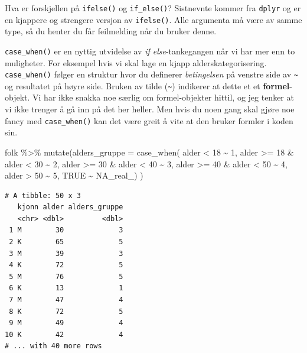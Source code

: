 \documentclass[
  letterpaper,
  DIV=11,
  numbers=noendperiod]{scrreprt}
\newenvironment{Shaded}{\begin{snugshade}}{\end{snugshade}}
\newcommand{\AttributeTok}[1]{\textcolor[rgb]{0.40,0.45,0.13}{#1}}
\newcommand{\ConstantTok}[1]{\textcolor[rgb]{0.56,0.35,0.01}{#1}}
\newcommand{\DecValTok}[1]{\textcolor[rgb]{0.68,0.00,0.00}{#1}}
\newcommand{\FunctionTok}[1]{\textcolor[rgb]{0.28,0.35,0.67}{#1}}
\newcommand{\NormalTok}[1]{\textcolor[rgb]{0.00,0.23,0.31}{#1}}
\newcommand{\SpecialCharTok}[1]{\textcolor[rgb]{0.37,0.37,0.37}{#1}}
\begin{document}
Hva er forskjellen på \texttt{ifelse()} og \texttt{if\_else()}?
Sistnevnte kommer fra \texttt{dplyr} og er en kjappere og strengere
versjon av \texttt{ifelse()}. Alle argumenta må være av samme type, så
du henter du får feilmelding når du bruker denne.

\texttt{case\_when()} er en nyttig utvidelse av \emph{if
else}-tankegangen når vi har mer enn to muligheter. For eksempel hvis vi
skal lage en kjapp alderskategorisering. \texttt{case\_when()} følger en
struktur hvor du definerer \emph{betingelsen} på venstre side av
\texttt{\textasciitilde{}} og resultatet på høyre side. Bruken av tilde
(\texttt{\textasciitilde{}}) indikerer at dette et et
\textbf{formel}-objekt. Vi har ikke snakka noe særlig om formel-objekter
hittil, og jeg tenker at vi ikke trenger å gå inn på det her heller. Men
hvis du noen gang skal gjøre noe fancy med \texttt{case\_when()} kan det
være greit å vite at den bruker formler i koden sin.

\begin{Shaded}
\begin{Highlighting}[]
\NormalTok{folk }\SpecialCharTok{\%\textgreater{}\%} 
  \FunctionTok{mutate}\NormalTok{(}\AttributeTok{alders\_gruppe =} \FunctionTok{case\_when}\NormalTok{(}
\NormalTok{    alder }\SpecialCharTok{\textless{}} \DecValTok{18} \SpecialCharTok{\textasciitilde{}} \DecValTok{1}\NormalTok{, }
\NormalTok{    alder }\SpecialCharTok{\textgreater{}=} \DecValTok{18} \SpecialCharTok{\&}\NormalTok{ alder }\SpecialCharTok{\textless{}} \DecValTok{30} \SpecialCharTok{\textasciitilde{}} \DecValTok{2}\NormalTok{,}
\NormalTok{    alder }\SpecialCharTok{\textgreater{}=} \DecValTok{30} \SpecialCharTok{\&}\NormalTok{ alder }\SpecialCharTok{\textless{}} \DecValTok{40} \SpecialCharTok{\textasciitilde{}} \DecValTok{3}\NormalTok{,}
\NormalTok{    alder }\SpecialCharTok{\textgreater{}=} \DecValTok{40} \SpecialCharTok{\&}\NormalTok{ alder }\SpecialCharTok{\textless{}} \DecValTok{50} \SpecialCharTok{\textasciitilde{}} \DecValTok{4}\NormalTok{,}
\NormalTok{    alder }\SpecialCharTok{\textgreater{}} \DecValTok{50} \SpecialCharTok{\textasciitilde{}} \DecValTok{5}\NormalTok{,}
    \ConstantTok{TRUE} \SpecialCharTok{\textasciitilde{}} \ConstantTok{NA\_real\_}\NormalTok{)}
\NormalTok{  )}
\end{Highlighting}
\end{Shaded}

\begin{verbatim}
# A tibble: 50 x 3
   kjonn alder alders_gruppe
   <chr> <dbl>         <dbl>
 1 M        30             3
 2 K        65             5
 3 M        39             3
 4 K        72             5
 5 M        76             5
 6 K        13             1
 7 M        47             4
 8 K        72             5
 9 M        49             4
10 K        42             4
# ... with 40 more rows
\end{verbatim}
\end{document}
